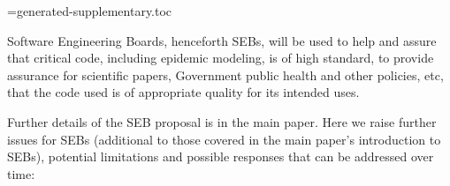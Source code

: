 \documentclass{article}
\begin{document}
\noindent\vbox{%
\def\contents#1#2{\vskip 0mm \noindent{\bfseries #1} \dotfill\ #2\\}
\def\subcontents#1#2{\hbox to 1em{}{#1} \dotfill\ #2\\}
\noindent
{}
}

\newwrite\contentsfile
\immediate\openout\contentsfile=generated-supplementary.toc

\newpage
{}

Software Engineering Boards, henceforth SEBs, will be used to help and assure that critical code, including epidemic modeling, is of high standard, to provide assurance for scientific papers, Government public health and other policies, etc, that the code used is of appropriate quality for its intended uses.  

Further details of the SEB proposal is in the main paper. Here we raise further issues for SEBs (additional to those covered in the main paper's introduction to SEBs), potential limitations and possible responses that can be addressed over time:
\end{document}
